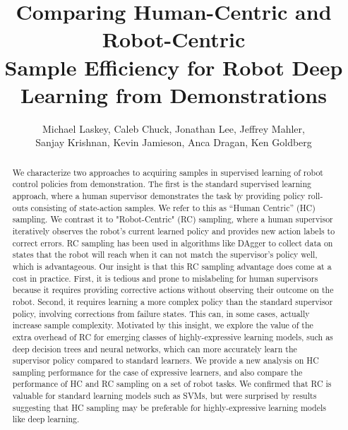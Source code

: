 \documentclass[10pt, conference]{ieeeconf}      %
\title{Comparing Human-Centric and Robot-Centric \\
Sample Efficiency for Robot Deep Learning from Demonstrations}
\author{Michael Laskey, Caleb Chuck, Jonathan Lee, Jeffrey Mahler,\\ Sanjay Krishnan, Kevin Jamieson, Anca Dragan, Ken Goldberg}
\begin{document}
\maketitle
\thispagestyle{empty}
\pagestyle{empty}







\begin{abstract}
We characterize two approaches to acquiring samples in supervised learning of robot control policies from demonstration. The first is the standard supervised learning approach, where a human supervisor demonstrates the task by providing policy roll-outs consisting of state-action samples. We refer to this as “Human Centric” (HC) sampling. We contrast it to "Robot-Centric" (RC) sampling, where a human supervisor iteratively observes the robot's current learned policy and provides new action labels to correct errors.  
RC sampling has been used in algorithms like DAgger to collect data on states that the robot will reach when it can not match the supervisor's policy well, which is advantageous.  
Our insight is that this RC sampling advantage does come at a cost in practice. First, it is tedious and prone to mislabeling for human supervisors because it requires providing corrective actions without observing their outcome on the robot. Second, it requires learning a more complex policy than the standard supervisor policy, involving corrections from failure states. This can, in some cases, actually increase sample complexity.  Motivated by this insight, we explore the value of the extra overhead of RC for emerging classes of highly-expressive learning models, such as deep decision trees and neural networks, which can more accurately learn the supervisor policy compared to standard learners.  We provide a new analysis on HC sampling performance for the case of expressive learners, and also compare the performance of HC and RC sampling on a set of robot tasks.  We confirmed that RC is valuable for standard learning models such as SVMs, but were surprised by results suggesting that HC sampling may be preferable for highly-expressive learning models like deep learning.

 \end{abstract}
\end{document}
